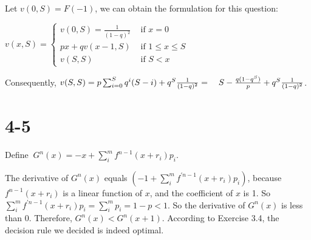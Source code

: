 \documentclass[UTF8]{article}
\begin{document}
Let $v(0,S) = F(-1)$, we can obtain the formulation for this question:

$v(x, S)=\left\{\begin{array}{ll}v(0,S)= \frac{1}{(1-q)^2} & \text { if } x=0 \\ p x+q v(x-1, S) & \text { if } 1 \leq x \leq S \\ v(S, S) & \text { if } S<x\end{array}\right.$

Consequently, $v(S,S) = p \sum_{i=0}^S q^i(S-i) + q^S\frac{1}{(1-q)^2} = \\ \quad S - \frac{q(1-q^S)}{p} + q^S \frac{1}{(1-q)^2}$.

\section*{4-5}
Define $~G^n (x) = -x + \sum_i^m f^{n-1}(x+r_i)p_i$.

The derivative of $G^n (x)$ equals $(-1 + \sum_i^m f^{'n-1}(x+r_i)p_i)$, because $f^{n-1}(x+r_i)$ is a linear function of $x$, and the coefficient of $x$ is 1. So $\sum_i^m f^{'n-1}(x+r_i)p_i = \sum_i^m p_i = 1-p < 1$. So the derivative of $G^n (x)$ is less than 0. Therefore, $G^n (x) < G^n (x+1)$. According to Exercise 3.4, the decision rule we decided is indeed optimal.
\end{document}
